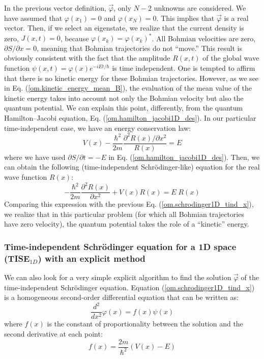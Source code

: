 \documentclass[nofootinbib, secnumarabic, amsmath, nobibnotes,10pt,aps,pra]{revtex4-1}
\newcommand{\eref}[1]{Eq. (\ref{#1})}
\newcommand{\Eref}[1]{Equation (\ref{#1})}
\begin{document}
In the previous vector definition, $\vec \varphi$, only $N - 2$ unknowns are considered. We have assumed that $\varphi(x_1) = 0$ and $\varphi(x_N) = 0$. This implies that $\vec \varphi$ is a real vector. Then, if we select an eigenstate,  we realize that the current density is zero, $J(x,t) = 0$, because $\varphi(x_k) = \varphi(x_k)^*$. All Bohmian velocities are zero, $\partial S/\partial x = 0$, meaning that Bohmian trajectories do not ``move.'' This result is obviously consistent with the fact that the amplitude $R(x,t)$ of the global wave function $\psi(x,t) = \varphi(x) e^{-iE t/\hbar}$ is time independent. One is tempted to affirm that there is no kinetic energy for these Bohmian trajectories. However, as we see in \eref{om.kinetic_energy_mean_B}, the evaluation of the mean value of the kinetic energy takes into account not only the Bohmian velocity but also the quantum potential. We can explain this point, differently, from the quantum Hamilton--Jacobi equation, \eref{om.hamilton_jacobi1D_des}. In our particular time-independent case, we have an energy conservation law:
\begin{equation*}
V(x) - \frac{\hbar^2} {2 m} \frac{{\partial}^2 R(x)/ \partial x^2} {R(x)} = E
\end{equation*}
where we have used $\partial S/\partial t = -E$ in \eref{om.hamilton_jacobi1D_des}. Then, we can obtain the following (time-independent Schr\"odinger-like) equation for the real wave function $R(x)$:
\begin{equation}
\label{om.schrodinger1D_tind_x_for R}
-\frac{\hbar^2} {2 m} \frac{{\partial}^2 R(x)} {\partial x^2} + V(x) R(x) = E \; R(x)
\end{equation}
Comparing this expression with the previous
\eref{om.schrodinger1D_tind_x}, we realize that in this particular
problem (for which all Bohmian trajectories have zero velocity), the quantum
potential takes the role of a ``kinetic'' energy.

\subsubsection{Time-independent Schr\"odinger equation for a 1D space (TISE$_{1D}$) with an explicit method}

We can also look for a very simple explicit algorithm to find the solution $\vec \varphi$ of the time-independent Schr\"odinger equation. \Eref{om.schrodinger1D_tind_x} is a homogeneous second-order differential equation that can be written as:
\begin{equation}
\frac{{d}^{2}}{d{x}^{2}}\varphi(x) = f(x)\psi (x)
\label{om.numerov1}
\end{equation}
where $f(x)$ is the constant of proportionality between the solution and the second derivative at each point:
\begin{equation}
f(x) = \frac{ 2 m} {{\hbar }^{2}}(V(x) - {E})
\end{equation}
\end{document}

